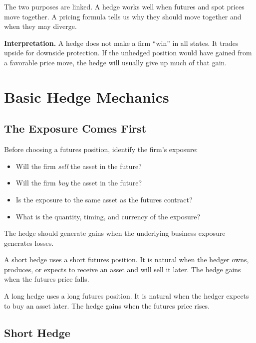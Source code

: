 The two purposes are linked. A hedge works well when futures and spot prices
move together. A pricing formula tells us why they should move together and when
they may diverge.

\begin{boxF}
\textbf{Interpretation.} A hedge does not make a firm ``win'' in all states. It
trades upside for downside protection. If the unhedged position would have gained
from a favorable price move, the hedge will usually give up much of that gain.
\end{boxF}

\section{Basic Hedge Mechanics}

\subsection{The Exposure Comes First}

Before choosing a futures position, identify the firm's exposure:
\begin{itemize}
    \item Will the firm \emph{sell} the asset in the future?
    \item Will the firm \emph{buy} the asset in the future?
    \item Is the exposure to the same asset as the futures contract?
    \item What is the quantity, timing, and currency of the exposure?
\end{itemize}

The hedge should generate gains when the underlying business exposure generates
losses.

\begin{defN}
A short hedge uses a short futures position. It is natural when the hedger owns,
produces, or expects to receive an asset and will sell it later. The hedge gains
when the futures price falls.
\end{defN}

\begin{defN}
A long hedge uses a long futures position. It is natural when the hedger expects
to buy an asset later. The hedge gains when the futures price rises.
\end{defN}

\subsection{Short Hedge}

